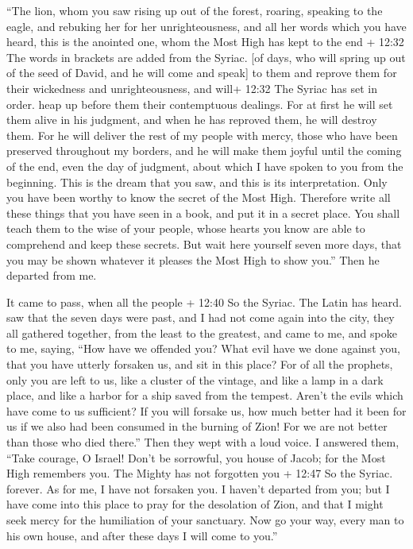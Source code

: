  ``The lion, whom you saw rising up out of the forest,
roaring, speaking to the eagle, and rebuking her for her
unrighteousness, and all her words which you have heard, 
this is the anointed one, whom the Most High has kept to the end + 12:32
The words in brackets are added from the Syriac. {[}of days, who will
spring up out of the seed of David, and he will come and speak{]} to
them and reprove them for their wickedness and unrighteousness, and
will+ 12:32 The Syriac has set in order. heap up before them their
contemptuous dealings.  For at first he will set them alive
in his judgment, and when he has reproved them, he will destroy them.
 For he will deliver the rest of my people with mercy,
those who have been preserved throughout my borders, and he will make
them joyful until the coming of the end, even the day of judgment, about
which I have spoken to you from the beginning.  This is the
dream that you saw, and this is its interpretation.  Only
you have been worthy to know the secret of the Most High. 
Therefore write all these things that you have seen in a book, and put
it in a secret place.  You shall teach them to the wise of
your people, whose hearts you know are able to comprehend and keep these
secrets.  But wait here yourself seven more days, that you
may be shown whatever it pleases the Most High to show you.'' Then he
departed from me.

 It came to pass, when all the people + 12:40 So the
Syriac. The Latin has heard. saw that the seven days were past, and I
had not come again into the city, they all gathered together, from the
least to the greatest, and came to me, and spoke to me, saying,
 ``How have we offended you? What evil have we done against
you, that you have utterly forsaken us, and sit in this place?
 For of all the prophets, only you are left to us, like a
cluster of the vintage, and like a lamp in a dark place, and like a
harbor for a ship saved from the tempest.  Aren't the evils
which have come to us sufficient?  If you will forsake us,
how much better had it been for us if we also had been consumed in the
burning of Zion!  For we are not better than those who died
there.'' Then they wept with a loud voice. I answered them,
 ``Take courage, O Israel! Don't be sorrowful, you house of
Jacob;  for the Most High remembers you. The Mighty has not
forgotten you + 12:47 So the Syriac. forever.  As for me, I
have not forsaken you. I haven't departed from you; but I have come into
this place to pray for the desolation of Zion, and that I might seek
mercy for the humiliation of your sanctuary.  Now go your
way, every man to his own house, and after these days I will come to
you.''


